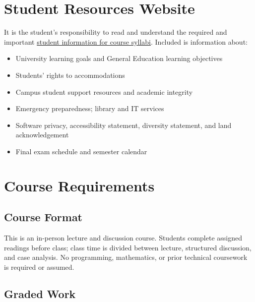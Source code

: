\documentclass[12pt]{article}
\begin{document}
\section*{Student Resources Website}
It is the student's responsibility to read and understand the required and important \href{https://fdc.fullerton.edu/teaching/student-info-syllabi.html}{student information for course syllabi}. Included is information about:

\begin{itemize}
\item University learning goals and General Education learning objectives
\item Students' rights to accommodations
\item Campus student support resources and academic integrity
\item Emergency preparedness; library and IT services
\item Software privacy, accessibility statement, diversity statement, and land acknowledgement
\item Final exam schedule and semester calendar
\end{itemize}

\section*{Course Requirements}

\subsection*{Course Format}
This is an in-person lecture and discussion course. Students complete assigned readings before class; class time is divided between lecture, structured discussion, and case analysis. No programming, mathematics, or prior technical coursework is required or assumed.

\subsection*{Graded Work}
\end{document}
